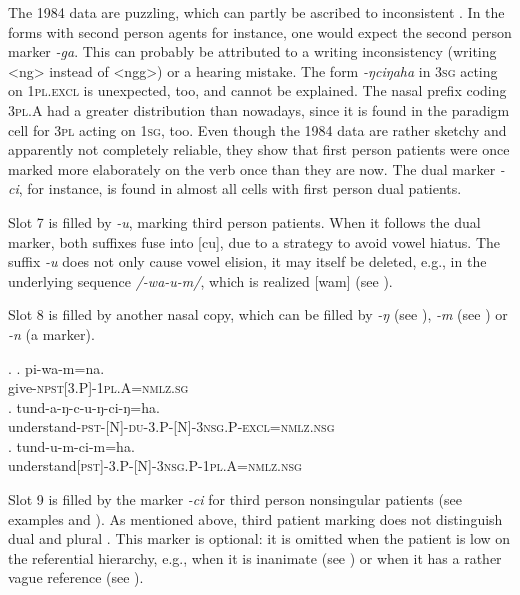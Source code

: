 \newpage
The 1984 data are puzzling, which can partly be ascribed to inconsistent . In the forms with second person agents for instance, one would expect the second person marker \emph{-ga}. This can probably be attributed to a writing inconsistency (writing <ng> instead of <ngg>) or a hearing mistake. The form \emph{-ŋciŋaha} in {\scshape 3sg} acting on {\scshape 1pl.excl} is unexpected, too, and cannot be explained. The nasal prefix coding {\scshape 3pl.A} had a greater distribution than nowadays, since it is found in the paradigm cell for {\scshape 3pl} acting on {\scshape 1sg}, too. Even though the 1984 data are rather sketchy and apparently not completely reliable, they show that first person patients were once marked more elaborately on the verb once than they are now. The dual  marker \emph{-ci}, for instance, is found in almost all cells with first person dual patients. 

Slot 7 is filled by  \emph{-u}, marking third person patients. When it follows the dual marker, both suffixes fuse into [cu], due to a strategy to avoid vowel hiatus. The suffix \emph{-u} does not only cause vowel elision, it may itself be deleted, e.g., in the underlying sequence \emph{/-wa-u-m/}, which is realized [wam] (see \Next[a]). 

Slot 8 is filled by another nasal copy, which can be filled by \emph{-ŋ} (see \Next[b]), \emph{-m} (see \Next[c]) or \emph{-n} (a  marker).

\ex. \ag. pi-wa-m=na.\\
	give{\scshape -npst[3.P]-1pl.A=nmlz.sg}\\
	\bg. tund-a-ŋ-c-u-ŋ-ci-ŋ=ha.\\
	understand{\scshape -pst-[N]-du-3.P-[N]-3nsg.P-excl=nmlz.nsg}\\
	\bg.	tund-u-m-ci-m=ha.\\
	understand{\scshape [pst]-3.P-[N]-3nsg.P-1pl.A=nmlz.nsg}\\

	
Slot 9  is filled by the marker \emph{-ci} for third person nonsingular patients (see examples \Last[b] and \Last[c]). As mentioned above, third   patient marking does not distinguish dual and plural . This marker is optional: it is omitted when the patient is low on the referential hierarchy, e.g., when it is inanimate (see \Next[a]) or when it has a rather vague reference (see \Next[b]). 
\largerpage


